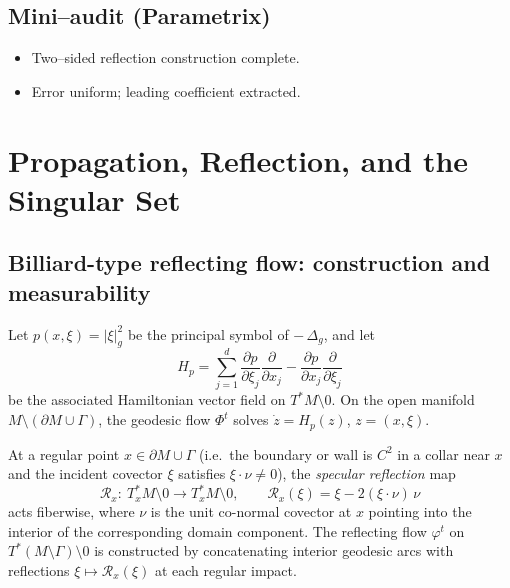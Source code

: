 \subsection*{Mini–audit (Parametrix)}
\begin{itemize}
  \item Two–sided reflection construction complete.
  \item Error uniform; leading coefficient extracted.
\end{itemize}


\section{Propagation, Reflection, and the Singular Set}
\label{sec:propagation}

\subsection{Billiard-type reflecting flow: construction and measurability}
Let $p(x,\xi)=|\xi|_g^2$ be the principal symbol of $-\,\Delta_g$, and let
\[
H_p = \sum_{j=1}^d \frac{\partial p}{\partial \xi_j}\frac{\partial}{\partial x_j}
   - \frac{\partial p}{\partial x_j}\frac{\partial}{\partial \xi_j}
\]
be the associated Hamiltonian vector field on $T^*M\setminus 0$. On the open manifold $M\setminus (\partial M\cup\Gamma)$, the geodesic flow $\Phi^t$ solves $\dot z = H_p(z)$, $z=(x,\xi)$.

At a regular point $x\in\partial M\cup\Gamma$ (i.e.\ the boundary or wall is $C^2$ in a collar near $x$ and the incident covector $\xi$ satisfies $\xi\cdot \nu\neq 0$), the \emph{specular reflection} map
\[
\mathcal R_x:\ T_x^*M\setminus 0 \to T_x^*M\setminus 0, 
\qquad \mathcal R_x(\xi)=\xi-2(\xi\cdot \nu)\,\nu
\]
acts fiberwise, where $\nu$ is the unit co-normal covector at $x$ pointing into the interior of the corresponding domain component. The reflecting flow $\varphi^t$ on $T^*(M\setminus\Gamma)\setminus 0$ is constructed by concatenating interior geodesic arcs with reflections $\xi\mapsto \mathcal R_x(\xi)$ at each regular impact.

